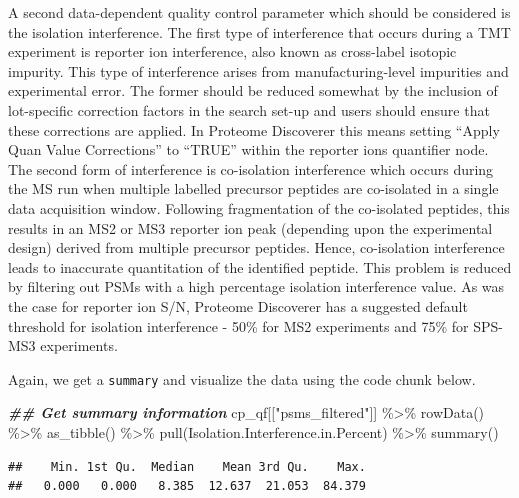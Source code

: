 \documentclass[9pt,a4paper,]{extarticle}
\newenvironment{Shaded}{\begin{snugshade}}{\end{snugshade}}
\newcommand{\DocumentationTok}[1]{\textcolor[rgb]{0.56,0.35,0.01}{\textbf{\textit{#1}}}}
\newcommand{\FunctionTok}[1]{\textcolor[rgb]{0.00,0.00,0.00}{#1}}
\newcommand{\NormalTok}[1]{#1}
\newcommand{\SpecialCharTok}[1]{\textcolor[rgb]{0.00,0.00,0.00}{#1}}
\newcommand{\StringTok}[1]{\textcolor[rgb]{0.31,0.60,0.02}{#1}}
\begin{document}
A second data-dependent quality control parameter which should be considered is
the isolation interference. The first type of interference that occurs during a
TMT experiment is reporter ion interference, also known as cross-label isotopic
impurity. This type of interference arises from manufacturing-level impurities
and experimental error. The former should be reduced somewhat by the inclusion
of lot-specific correction factors in the search set-up and users should ensure
that these corrections are applied. In Proteome Discoverer this means setting
``Apply Quan Value Corrections'' to ``TRUE'' within the reporter ions quantifier
node. The second form of interference is co-isolation interference which occurs
during the MS run when multiple labelled precursor peptides are co-isolated in a
single data acquisition window. Following fragmentation of the co-isolated
peptides, this results in an MS2 or MS3 reporter ion peak (depending upon the
experimental design) derived from multiple precursor peptides. Hence,
co-isolation interference leads to inaccurate quantitation of the identified
peptide. This problem is reduced by filtering out PSMs with a high percentage
isolation interference value. As was the case for reporter ion S/N, Proteome
Discoverer has a suggested default threshold for isolation interference - 50\%
for MS2 experiments and 75\% for SPS-MS3 experiments.

Again, we get a \texttt{summary} and visualize the data using the code chunk below.

\begin{Shaded}
\begin{Highlighting}[]
\DocumentationTok{\#\# Get summary information}
\NormalTok{cp\_qf[[}\StringTok{"psms\_filtered"}\NormalTok{]] }\SpecialCharTok{\%\textgreater{}\%} 
  \FunctionTok{rowData}\NormalTok{() }\SpecialCharTok{\%\textgreater{}\%} 
  \FunctionTok{as\_tibble}\NormalTok{() }\SpecialCharTok{\%\textgreater{}\%} 
  \FunctionTok{pull}\NormalTok{(Isolation.Interference.in.Percent) }\SpecialCharTok{\%\textgreater{}\%} 
  \FunctionTok{summary}\NormalTok{()}
\end{Highlighting}
\end{Shaded}

\begin{verbatim}
##    Min. 1st Qu.  Median    Mean 3rd Qu.    Max. 
##   0.000   0.000   8.385  12.637  21.053  84.379
\end{verbatim}
\end{document}
